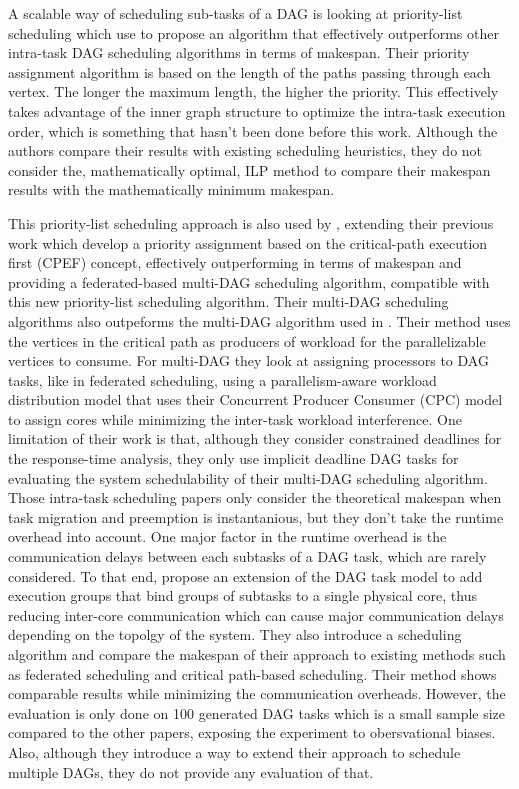 A scalable way of scheduling sub-tasks of a DAG 
is looking at priority-list scheduling
which \citet{He2019DagIntra} use to propose 
an algorithm that effectively outperforms
other intra-task DAG scheduling algorithms
in terms of makespan.
Their priority assignment algorithm
is based on the length of the paths passing through each vertex.
The longer the maximum length, the higher the priority.
This effectively takes advantage of the inner graph structure
to optimize the intra-task execution order,
which is something that hasn't been done before this work.
Although the authors compare their results with existing
scheduling heuristics, they do not consider 
the, mathematically optimal, ILP method to compare
their makespan results with the mathematically minimum makespan.

This priority-list scheduling approach is also 
used by \cite{Zhao2022DAGsched}, extending their previous work\cite{zhao2020DAGsched}
which develop a priority assignment based on 
the critical-path execution first (CPEF) concept,
effectively outperforming \citet{He2019DagIntra}
in terms of makespan and providing 
a federated-based multi-DAG scheduling algorithm,
compatible with this new priority-list scheduling algorithm.
Their multi-DAG scheduling algorithms also outpeforms 
the multi-DAG algorithm used in \cite{He2019DagIntra}.
Their method uses the vertices in the critical path 
as producers of workload for the parallelizable vertices
to consume.
For multi-DAG they look at assigning processors
to DAG tasks, like in federated scheduling, using 
a parallelism-aware workload distribution model
that uses their Concurrent Producer Consumer (CPC) model
to assign cores while minimizing the inter-task workload interference.
One limitation of their work is that,
although they consider constrained deadlines for the response-time
analysis, they only use implicit deadline DAG tasks 
for evaluating the system schedulability of their multi-DAG 
scheduling algorithm.\\


Those intra-task scheduling papers only consider the theoretical
makespan when task migration and preemption 
is instantanious, but they don't take the runtime overhead into account.
One major factor in the runtime overhead is the communication 
delays between each subtasks of a DAG task, which are rarely considered.
To that end, \citet{Shi2024DagExecGroups}
propose an extension of the DAG task model to add 
execution groups that bind groups of subtasks
to a single physical core, thus reducing 
inter-core communication which can cause major
communication delays depending on the topolgy of the system.
They also introduce a scheduling algorithm 
and compare the makespan of their approach to existing methods
such as federated scheduling and critical path-based scheduling.
Their method shows comparable results while minimizing 
the communication overheads.
However, the evaluation is only done on 100 generated 
DAG tasks which is a small sample size compared to the other papers\cite{Zhao2022DAGsched}\cite{He2019DagIntra},
exposing the experiment to obersvational biases.
Also, although they introduce a way to extend their approach to schedule
multiple DAGs, they do not provide any evaluation of that.


